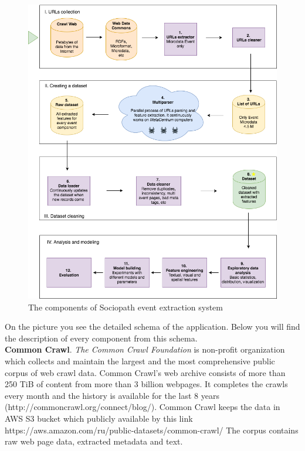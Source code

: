 \begin{figure}[h]
\begin{center}
\includegraphics[width=1.0\textwidth]{figures04/Architecure}
\caption{The components of Sociopath event extraction system}
\label{fig:architecture}
\end{center}
\end{figure}

On the picture  you see the detailed schema of the application. Below you will find the description of every component from this schema.\\

\textbf{Common Crawl}. \textit{The Common Crawl Foundation} is non-profit organization which collects and maintain the largest and the most comprehensive public corpus of web crawl data. Common Crawl's web archive consists of more than 250 TiB of content from more than 3 billion webpages. It completes the crawls every month and the history is available for the last 8 years (http://commoncrawl.org/connect/blog/). Common Crawl keeps the data in AWS S3 bucket which publicly available by this link https://aws.amazon.com/ru/public-datasets/common-crawl/  The corpus contains raw web page data, extracted metadata and text. \\

